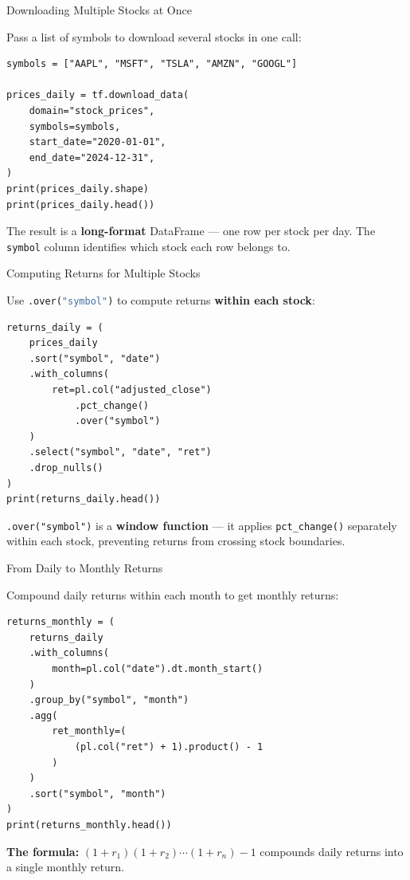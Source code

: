 \documentclass[9pt,aspectratio=169]{beamer}
\newcommand{\py}[1]{\lstinline[language=Python]{#1}}
\begin{document}
\begin{frame}[fragile]{Downloading Multiple Stocks at Once}

Pass a list of symbols to download several stocks in one call:

\begin{lstlisting}
symbols = ["AAPL", "MSFT", "TSLA", "AMZN", "GOOGL"]

prices_daily = tf.download_data(
    domain="stock_prices",
    symbols=symbols,
    start_date="2020-01-01",
    end_date="2024-12-31",
)
print(prices_daily.shape)
print(prices_daily.head())
\end{lstlisting}

\medskip

The result is a \textbf{long-format} DataFrame --- one row per stock per day. The \texttt{symbol} column identifies which stock each row belongs to.

\end{frame}


\begin{frame}[fragile]{Computing Returns for Multiple Stocks}

Use \py{.over("symbol")} to compute returns \textbf{within each stock}:

\begin{lstlisting}
returns_daily = (
    prices_daily
    .sort("symbol", "date")
    .with_columns(
        ret=pl.col("adjusted_close")
            .pct_change()
            .over("symbol")
    )
    .select("symbol", "date", "ret")
    .drop_nulls()
)
print(returns_daily.head())
\end{lstlisting}

\medskip

\begin{highlightbox}
\centering
\texttt{.over("symbol")} is a \textbf{window function} --- it applies \texttt{pct\_change()} separately within each stock, preventing returns from crossing stock boundaries.
\end{highlightbox}

\end{frame}


\begin{frame}[fragile]{From Daily to Monthly Returns}

Compound daily returns within each month to get monthly returns:

\begin{lstlisting}
returns_monthly = (
    returns_daily
    .with_columns(
        month=pl.col("date").dt.month_start()
    )
    .group_by("symbol", "month")
    .agg(
        ret_monthly=(
            (pl.col("ret") + 1).product() - 1
        )
    )
    .sort("symbol", "month")
)
print(returns_monthly.head())
\end{lstlisting}

\medskip

\textbf{The formula:} $(1 + r_1)(1 + r_2) \cdots (1 + r_n) - 1$ compounds daily returns into a single monthly return.

\end{frame}
\end{document}
